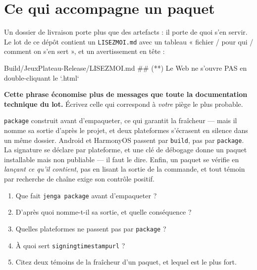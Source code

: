\section{Ce qui accompagne un paquet}

\begin{nkretenir}
Un dossier de livraison porte plus que des artefacts : il porte de quoi s'en
servir. Le lot de ce dépôt contient un \texttt{LISEZMOI.md} avec un tableau
« fichier / pour qui / comment on s'en sert », et un avertissement en tête :

\begin{nkcode}[listing options={escapeinside={(*}{*)}}]{Build/JeuxPlateau-Release/LISEZMOI.md}
## (*\alerte{}*) Le Web ne s'ouvre PAS en double-cliquant le `.html`
\end{nkcode}

\textbf{Cette phrase économise plus de messages que toute la documentation
technique du lot.} Écrivez celle qui correspond à \emph{votre} piège le plus
probable.
\end{nkretenir}

\begin{nkbilan}
\texttt{package} construit avant d'empaqueter, ce qui garantit la fraîcheur ---
mais il nomme sa sortie d'après le projet, et deux plateformes s'écrasent en
silence dans un même dossier. Android et HarmonyOS passent par \texttt{build},
pas par \texttt{package}. La signature se déclare par plateforme, et une clé de
débogage donne un paquet installable mais non publiable --- il faut le dire.
Enfin, un paquet se vérifie en \emph{lançant ce qu'il contient}, pas en lisant la
sortie de la commande, et tout témoin par recherche de chaîne exige son contrôle
positif.
\end{nkbilan}

\begin{nkquestions}
\begin{enumerate}
\item Que fait \texttt{jenga package} avant d'empaqueter ?
\item D'après quoi nomme-t-il sa sortie, et quelle conséquence ?
\item Quelles plateformes ne passent pas par \texttt{package} ?
\item À quoi sert \texttt{signingtimestampurl} ?
\item Citez deux témoins de la fraîcheur d'un paquet, et lequel est le plus fort.
\end{enumerate}
\end{nkquestions}

